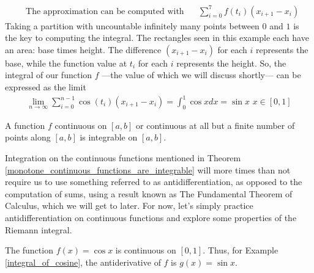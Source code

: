 \begin{example}
{
}
\begin{align*}
    &\text{The approximation can be computed with} \hspace{20pt} \sum_{i=0}^{7} f(t_{i})(x_{i+1} - x_{i})
\end{align*}
Taking a partition with uncountable infinitely many points between $0$ and $1$ is the key to computing the integral. The rectangles seen in this example each have an area: base times height. The difference $(x_{i+1} - x_{i})$ for each $i$ represents the base, while the function value at $t_{i}$ for each $i$ represents the height. So, the integral of our function $f$ ---the value of which we will discuss shortly--- can be expressed as the limit 
\begin{align*}
    \lim_{n \longrightarrow \infty} \sum_{i=0}^{n-1} \cos(t_{i}) (x_{i+1} - x_{i}) = \int_{0}^{1} \cos x dx = \sin x \hspace{4pt} x \in [0, 1]
\end{align*}
\label{integral_of_cosine}
\end{example}

\begin{theorem}
A function $f$ continuous on $[a, b]$ or continuous at all but a finite number of points along $[a, b]$ is integrable on $[a, b]$.
\label{monotone_continuous_functions_are_integrable}
\end{theorem}

Integration on the continuous functions mentioned in Theorem \ref{monotone_continuous_functions_are_integrable} will more times than not require us to use something referred to as antidifferentiation, as opposed to the computation of sums, using a result known as The Fundamental Theorem of Calculus, which we will get to later. For now, let's simply practice antidifferentiation on continuous functions and explore some properties of the Riemann integral. 

\begin{example}
The function $f(x) = \cos x$ is continuous on $[0, 1]$. Thus, for Example \ref{integral_of_cosine}, the antiderivative of $f$ is $g(x) = \sin x$.
\end{example}

